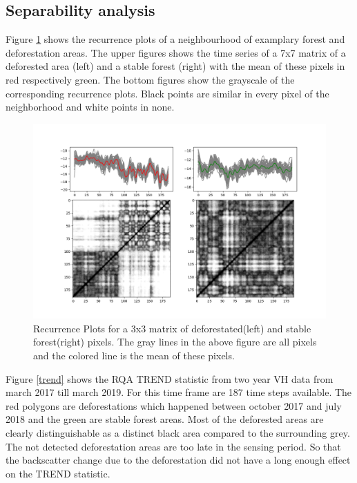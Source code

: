 \documentclass{article}
\begin{document}
\subsection{Separability analysis}

Figure \ref{rpforest} shows the recurrence plots of a neighbourhood of examplary forest and deforestation areas.
The upper figures shows the time series of a 7x7 matrix of a deforested area (left) and a stable forest (right) with the mean of these pixels in red respectively green.
The bottom figures show the grayscale of the corresponding recurrence plots.
Black points are similar in every pixel of the neighborhood and white points in none.


\begin{figure}
  \includegraphics[width=\textwidth]{figs/S1_Hidalgo_timestack_20km_VH___lin_20_test_tandemdem12_emd__rp_deffor_3.png}
  \caption{Recurrence Plots for a 3x3 matrix of deforestated(left) and stable forest(right) pixels.
           The gray lines in the above figure are all pixels and the colored line is the mean of these pixels.}
  \label{rpforest}
\end{figure}

Figure \ref{trend} shows the RQA TREND statistic from two year VH data from march 2017 till march 2019.
For this time frame are 187 time steps available.
The red polygons are deforestations which happened between october 2017 and july 2018 and the green are stable forest areas.
Most of the deforested areas are clearly distinguishable as a distinct black area compared to the surrounding grey.
The not detected deforestation areas are too late in the sensing period.
So that the backscatter change due to the deforestation did not have a long enough effect on the TREND statistic.
\end{document}
